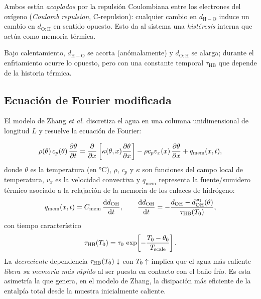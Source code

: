 \noindent Ambos están \emph{acoplados} por la repulsión Coulombiana entre los 
electrones del oxígeno (\textit{Coulomb repulsion}, C-repulsion): cualquier cambio 
en $d_{\mathrm{H{-}O}}$ induce un cambio en $d_{\mathrm{O{:}H}}$ en sentido 
opuesto. Esto da al sistema una \emph{histéresis} interna que actúa como memoria 
térmica.

Bajo calentamiento, $d_{\mathrm{H{-}O}}$ se acorta (anómalamente) y 
$d_{\mathrm{O{:}H}}$ se alarga; durante el enfriamiento ocurre lo opuesto, pero 
con una constante temporal $\tau_{\mathrm{HB}}$ que depende de la historia térmica.

\subsection{Ecuación de Fourier modificada}

El modelo de Zhang \emph{et al.} discretiza el agua en una columna 
unidimensional de longitud $L$ y resuelve la ecuación de Fourier:

\begin{equation}
    \rho(\theta) \, c_{p}(\theta) \, \pdv{\theta}{t} 
    = \pdv{x} \left[ \kappa(\theta,x) \pdv{\theta}{x} \right] 
    - \rho c_{p} v_{x}(x) \, \pdv{\theta}{x} 
    + q_{\mathrm{mem}}(x,t),
    \label{eq:fourier_zhang}
\end{equation}
%
donde $\theta$ es la temperatura (en \si{\celsius}), $\rho$, $c_{p}$ y $\kappa$ 
son funciones del campo local de temperatura, $v_{x}$ es la velocidad 
convectiva y $q_{\mathrm{mem}}$ representa la fuente/sumidero térmico asociado a 
la relajación de la memoria de los enlaces de hidrógeno:
\begin{equation}
    q_{\mathrm{mem}}(x,t) = C_{\mathrm{mem}} \, \dv{d_{\mathrm{OH}}}{t}, 
    \qquad
    \dv{d_{\mathrm{OH}}}{t} = - \frac{d_{\mathrm{OH}} - d_{\mathrm{OH}}^{\mathrm{eq}}(\theta)}{\tau_{\mathrm{HB}}(T_{0})},
    \label{eq:hb_memory}
\end{equation}
%
con tiempo característico
\begin{equation}
    \tau_{\mathrm{HB}}(T_{0}) = \tau_{0} \, \exp\!\left[-\frac{T_{0} - \theta_{0}}{T_{\mathrm{scale}}}\right].
    \label{eq:tau_hb}
\end{equation}
%
La \emph{decreciente} dependencia $\tau_{\mathrm{HB}}(T_{0}) \downarrow$ con 
$T_{0} \uparrow$ implica que el agua más caliente \emph{libera su memoria más 
rápido} al ser puesta en contacto con el baño frío. Es esta asimetría la que 
genera, en el modelo de Zhang, la disipación más eficiente de la entalpía total 
desde la muestra inicialmente caliente.

